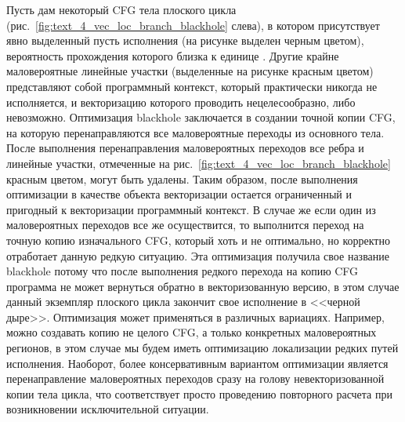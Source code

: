 Пусть дам некоторый CFG тела плоского цикла (рис.~\ref{fig:text_4_vec_loc_branch_blackhole} слева), в котором присутствует явно выделенный пусть исполнения (на рисунке выделен черным цветом), вероятность прохождения которого близка к единице \cite{Shabanov2021VecCFG}.
Другие крайне маловероятные линейные участки (выделенные на рисунке красным цветом) представляют собой программный контекст, который практически никогда не исполняется, и векторизацию которого проводить нецелесообразно, либо невозможно.
Оптимизация blackhole заключается в создании точной копии CFG, на которую перенаправляются все маловероятные переходы из основного тела.
После выполнения перенаправления маловероятных переходов все ребра и линейные участки, отмеченные на рис.~\ref{fig:text_4_vec_loc_branch_blackhole} красным цветом, могут быть удалены.
Таким образом, после выполнения оптимизации в качестве объекта векторизации остается ограниченный и пригодный к векторизации программный контекст.
В случае же если один из маловероятных переходов все же осуществится, то выполнится переход на точную копию изначального CFG, который хоть и не оптимально, но корректно отработает данную редкую ситуацию.
Эта оптимизация получила свое название blackhole потому что после выполнения редкого перехода на копию CFG программа не может вернуться обратно в векторизованную версию, в этом случае данный экземпляр плоского цикла закончит свое исполнение в <<черной дыре>>.
Оптимизация может применяться в различных вариациях.
Например, можно создавать копию не целого CFG, а только конкретных маловероятных регионов, в этом случае мы будем иметь оптимизацию локализации редких путей исполнения.
Наоборот, более консервативным вариантом оптимизации является перенаправление маловероятных переходов сразу на голову невекторизованной копии тела цикла, что соответствует просто проведению повторного расчета при возникновении исключительной ситуации.
